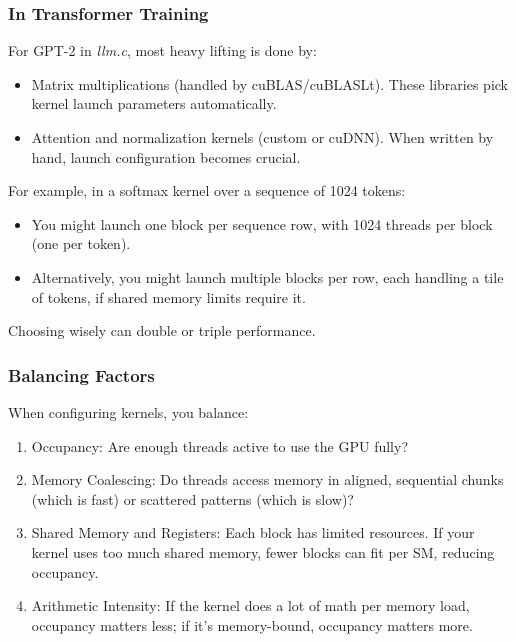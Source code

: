 \documentclass[
  letterpaper,
  DIV=11,
  numbers=noendperiod]{scrreprt}
\providecommand{\tightlist}{%
  \setlength{\itemsep}{0pt}\setlength{\parskip}{0pt}}
\begin{document}
\subsubsection{In Transformer Training}\label{in-transformer-training}

For GPT-2 in \emph{llm.c}, most heavy lifting is done by:

\begin{itemize}
\tightlist
\item
  Matrix multiplications (handled by cuBLAS/cuBLASLt). These libraries
  pick kernel launch parameters automatically.
\item
  Attention and normalization kernels (custom or cuDNN). When written by
  hand, launch configuration becomes crucial.
\end{itemize}

For example, in a softmax kernel over a sequence of 1024 tokens:

\begin{itemize}
\tightlist
\item
  You might launch one block per sequence row, with 1024 threads per
  block (one per token).
\item
  Alternatively, you might launch multiple blocks per row, each handling
  a tile of tokens, if shared memory limits require it.
\end{itemize}

Choosing wisely can double or triple performance.

\subsubsection{Balancing Factors}\label{balancing-factors}

When configuring kernels, you balance:

\begin{enumerate}
\def\labelenumi{\arabic{enumi}.}
\tightlist
\item
  Occupancy: Are enough threads active to use the GPU fully?
\item
  Memory Coalescing: Do threads access memory in aligned, sequential
  chunks (which is fast) or scattered patterns (which is slow)?
\item
  Shared Memory and Registers: Each block has limited resources. If your
  kernel uses too much shared memory, fewer blocks can fit per SM,
  reducing occupancy.
\item
  Arithmetic Intensity: If the kernel does a lot of math per memory
  load, occupancy matters less; if it's memory-bound, occupancy matters
  more.
\end{enumerate}
\end{document}
